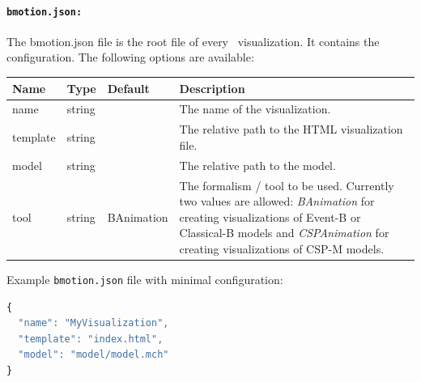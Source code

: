
\paragraph{\texttt{bmotion.json:}}
The bmotion.json file is the root file of every \bms\ visualization.
It contains the configuration.
The following options are available:

\begin{tabular}{ l l l p{7cm} }
  \textbf{Name} & \textbf{Type} & \textbf{Default} & \textbf{Description} \\
  \hline\noalign{\medskip}
  name & string & & The name of the visualization.\\
  \hline\noalign{\medskip}
  template & string & & The relative path to the HTML visualization file. \\
  \hline\noalign{\medskip}
  model & string & & The relative path to the model. \\
  \hline\noalign{\medskip}
  tool & string & BAnimation & The formalism / tool to be used. Currently two values are allowed: \textit{BAnimation} for creating visualizations of Event-B or Classical-B models and \textit{CSPAnimation} for creating visualizations of CSP-M models.\\
\end{tabular}

\vspace*{0.5cm}

Example \texttt{bmotion.json} file with minimal configuration:

\begin{lstlisting}[language=JavaScript]
{
  "name": "MyVisualization",
  "template": "index.html",
  "model": "model/model.mch"
}
\end{lstlisting}


